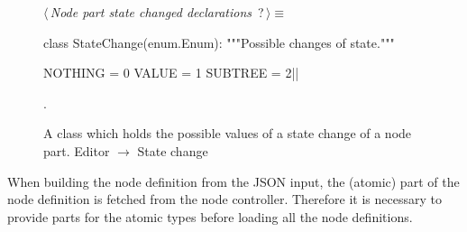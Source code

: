 \documentclass[%
    a4paper,    %
    justified,  %
    nobib,      %
    openany     %
]{tufte-book}
\makeatletter
\renewcommand{\label}[1]{\@tufte@label{##1}}%
\makeatother
\begin{document}
\begin{figure}
\begin{flushleft} \small
\begin{minipage}{\linewidth}\label{scrap118}\raggedright\small
{} $\langle\,${\itshape Node part state changed declarations}\nobreak\ {\footnotesize {?}}$\,\rangle\equiv$
\vspace{-1ex}
\begin{pythoncode}
class StateChange(enum.Enum):
    """Possible changes of state."""

    NOTHING  = 0
    VALUE    = 1
    SUBTREE  = 2|\NWsep|
\end{pythoncode}
\vspace{1.5ex}
\footnotesize
\begin{list}{}{\setlength{\itemsep}{-\parsep}\setlength{\itemindent}{-\leftmargin}}
\item {\NWtxtMacroNoRef}.

\item{}
\end{list}
\end{minipage}\vspace{4ex}
\end{flushleft}
\caption{A class which holds the possible values of a state change of a node
  part.
  \newline{}\newline{}Editor $\rightarrow$ State change}
\label{editor:lst:state-change}
\end{figure}

 When building
the node definition from the JSON input, the (atomic) part of the node
definition is fetched from the node controller. Therefore it is necessary to
provide parts for the atomic types before loading all the node definitions.
\end{document}
